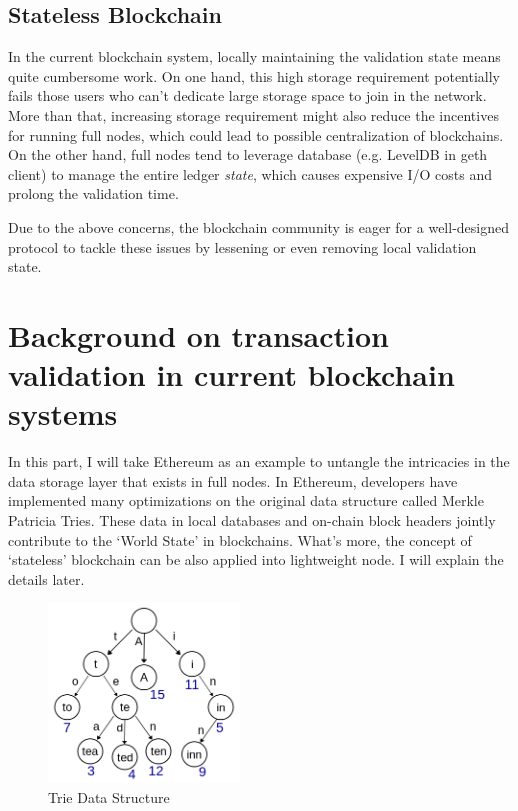 \documentclass[conference]{IEEEtran}
\begin{document}
\subsection{Stateless Blockchain}
In the current blockchain system, locally maintaining the validation state means quite cumbersome work. 
%
On one hand, this high storage requirement potentially fails those users who can't dedicate large storage space to join in the network.
%
More than that, increasing storage requirement might also reduce the incentives for running full nodes, which could lead to possible centralization of blockchains.
%
On the other hand, full nodes tend to leverage database (e.g. LevelDB in geth client) to manage the entire ledger \textit{state},
which causes expensive I/O costs and prolong the validation time.

Due to the above concerns, the blockchain community is eager for a well-designed protocol to tackle these issues by lessening or even removing local validation state.




\section{Background on transaction validation in current blockchain systems}
In this part, I will take Ethereum as an example to untangle the intricacies in the data storage layer that exists in full nodes.
%
In Ethereum, developers have implemented many optimizations on the original data structure called Merkle Patricia Tries.
%
These data in local databases and on-chain block headers jointly contribute to the `World State' in blockchains.
%
What's more, the concept of `stateless' blockchain can be also applied into lightweight node. 
%
I will explain the details later.

\begin{figure}[!t]
  \centering
  \includegraphics[width=2in]{figs/Trie.png}
  \caption{Trie Data Structure}
  \label{trie}
\end{figure}
\end{document}
